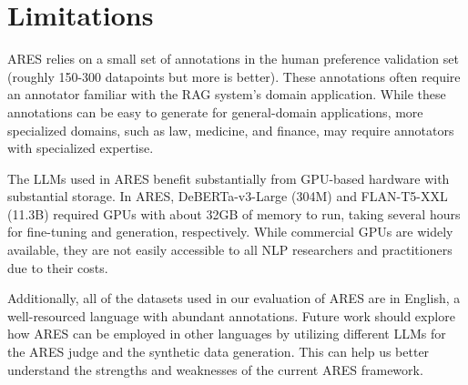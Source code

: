 
\section{Limitations}

ARES relies on a small set of annotations in the human preference validation set (roughly 150-300 datapoints but more is better). 
These annotations often require an annotator familiar with the RAG system's domain application.
While these annotations can be easy to generate for general-domain applications, more specialized domains, such as law, medicine, and finance, may require annotators with specialized expertise.

The LLMs used in ARES benefit substantially from GPU-based hardware with substantial storage. 
In ARES, DeBERTa-v3-Large (304M) and FLAN-T5-XXL (11.3B) required GPUs with about 32GB of memory to run, taking several hours for fine-tuning and generation, respectively.
While commercial GPUs are widely available, they are not easily accessible to all NLP researchers and practitioners due to their costs.

Additionally, all of the datasets used in our evaluation of ARES are in English, a well-resourced language with abundant annotations.
Future work should explore how ARES can be employed in other languages by utilizing different LLMs for the ARES judge and the synthetic data generation.
This can help us better understand the strengths and weaknesses of the current ARES framework.
